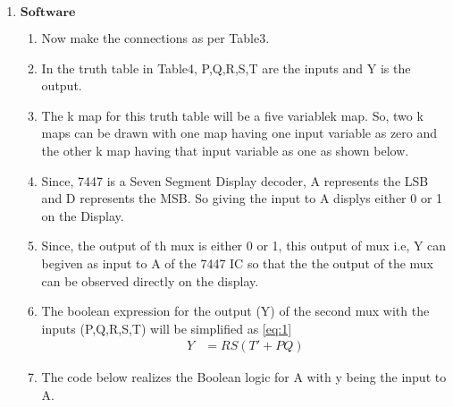 \documentclass{article}
\begin{document}
\begin{enumerate}
\begin{enumerate}
		\end{enumerate}
	\item $\textbf{Software}$
		\begin{enumerate}
			\item Now make the connections as per Table3.
				
			\item In the truth table in Table4, P,Q,R,S,T are the inputs and Y is the output.
				
			\item The k map for this truth table will be a five variablek map. So, two k maps can be drawn with one map having one input variable as zero and the other k map having that input variable as one as shown below.
				
		\item Since, 7447 is a Seven Segment Display decoder, A represents the LSB and D represents the MSB. So giving the input to A displys either 0 or 1 on the Display.
			\item Since, the output of th mux is either 0 or 1, this output of mux i.e, Y can begiven as input to A of the 7447 IC so that the the output of the mux can be observed directly on the display.
			\item The boolean expression for the output (Y) of the second mux with the inputs (P,Q,R,S,T) will be simplified as \ref{eq:1}
				\begin{align}
					{Y} &= {RS(T'+PQ)}
					\label{eq:1}
				\end{align}
				\item The code below realizes the Boolean logic for A with y being the input to A.\\
\end{enumerate}
\end{enumerate}
\end{document}
